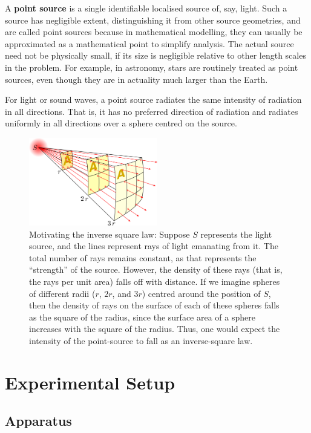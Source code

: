 \begin{refsection}
A \textbf{point source} is a single identifiable localised source of, say, light. Such a source has negligible extent, distinguishing it from other source geometries, and are called point sources because in mathematical modelling, they can usually be approximated as a mathematical point to simplify analysis. The actual source need not be physically small, if its size is negligible relative to other length scales in the problem. For example, in astronomy, stars are routinely treated as point sources, even though they are in actuality much larger than the Earth.

For light or sound waves, a point source radiates the same intensity of radiation in all directions. That is, it has no preferred direction of radiation and radiates uniformly in all directions over a sphere centred on the source.

\begin{figure}
    \centering
    \includegraphics[width=0.5\textwidth]{figs/inversesquarelaw.png}
    \caption{Motivating the inverse square law: Suppose $S$ represents the light source, and the lines represent rays of light emanating from it. The total number of rays remains constant, as that represents the ``strength'' of the source. However, the density of these rays (that is, the rays per unit area) falls off with distance. If we imagine spheres of different radii ($r$, $2r$, and $3r$) centred around the position of $S$, then the density of rays on the surface of each of these spheres falls as the square of the radius, since the surface area of a sphere increases with the square of the radius. Thus, one would expect the intensity of the point-source to fall as an inverse-square law.}
    \label{fig:isl}
\end{figure}


\section*{Experimental Setup}

\subsection*{Apparatus}


\end{refsection}
